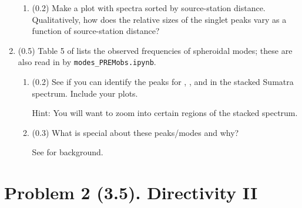 \documentclass[11pt,titlepage,fleqn]{article}
\begin{document}
\begin{enumerate}
\begin{enumerate}
\item (0.2) Make a plot with   spectra sorted by source-station distance. Qualitatively, how does the relative sizes of the singlet peaks vary as a function of source-station distance?
\end{enumerate}


\item (0.5) Table 5 of \citet{PREM} lists the observed frequencies of spheroidal modes; these are also read in by \verb+modes_PREMobs.ipynb+.
%
\begin{enumerate}
\item (0.2) See if you can identify the peaks for , , and  in the stacked Sumatra spectrum. Include your plots.

Hint: You will want to zoom into certain regions of the stacked spectrum.

\item (0.3) What is special about these peaks/modes and why?

See \citet[][p. 106]{SteinWysession} for background.
\end{enumerate}

\end{enumerate}


\pagebreak
\section*{Problem 2 (3.5). Directivity II}
\end{document}
